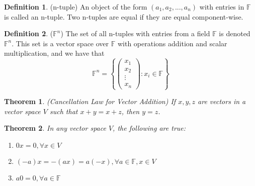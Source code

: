 \documentclass[12pt]{article}
\newtheorem{theorem}{Theorem}[section]
\theoremstyle{definition}
\newtheorem{definition}{Definition}[section]
\theoremstyle{remark}
\begin{document}
    \begin{definition}(n-tuple)
    An object of the form $(a_1, a_2, . . . , a_n)$ with entries in $\mathbb{F}$ is 
    called an n-tuple. Two n-tuples are equal if they are equal component-wise.
    \end{definition}

    \begin{definition}($\mathbb{F}^n$)
        The set of all n-tuples with entries from a field $\mathbb{F}$ is denoted $\mathbb{F}^n$. 
        This set is a vector space over $\mathbb{F}$ with operations
        addition and scalar multiplication, and we have that
        \begin{equation*}
            \mathbb{F}^n=\left\{ 
            \begin{pmatrix}
            x_{1}\\x_{2}\\\vdots \\ x_{n}
            \end{pmatrix} 
            :x_i \in \mathbb{F} \right\}
        \end{equation*}
        
    \end{definition}

    \begin{theorem}(Cancellation Law for Vector Addition)
        If $x,y,z$ are vectors in a vector space $V$ such that $x+y= x+z$, then $y=z$. 
    \end{theorem}

    \begin{theorem}
        In any vector space $V$, the following are true:
        \begin{enumerate}
            \item $0x = 0, \forall x\in V$
            \item $(-a)x=-(ax)=a(-x), \forall a \in \mathbb{F}, x\in V$
            \item $a0=0, \forall a \in \mathbb{F}$
        \end{enumerate}
    \end{theorem}
\end{document}
